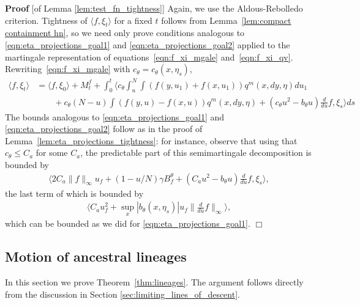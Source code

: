 \documentclass[12pt]{article}
\newenvironment {proof}{{\noindent\bf Proof }}{\hfill $\Box$ \medskip}
\newcommand{\lp}{\xi}              %
\numberwithin{equation}{section}
\begin{document}
\begin{proof}[of Lemma \ref{lem:test_fn_tightness}]
    Again, we use the Aldous-Rebolledo criterion.
    Tightness of $\langle f, \lp_t \rangle$ for a fixed $t$
    follows from Lemma~\ref{lem:compact containment hn},
    so we need only prove conditions analogous to
    \eqref{eqn:eta_projections_goal1}
    and \eqref{eqn:eta_projections_goal2}
    applied to the martingale representation
    of equations~\eqref{eqn:f_xi_mgale} and~\eqref{eqn:f_xi_qv}.
    Rewriting~\eqref{eqn:f_xi_mgale} with $c_\theta = c_\theta(x, \eta_s)$,
    \begin{align*}
        \langle f, \lp_t \rangle
        &=
        \langle f, \lp_0 \rangle
        + M^f_t
        + \int_0^t \Big\langle
            c_\theta \int_u^N \int (f(y, u_1) + f(x, u_1)) q^m(x,dy,\eta) du_1
        \\ {} &\qquad
            + c_\theta (N - u) \int (f(y, u) - f(x, u)) q^m(x,dy,\eta)
            + (c_\theta u^2 - b_\theta u) \frac{d}{du} f,
            \lp_s
        \Big\rangle ds
    \end{align*}
    The bounds analogous to \eqref{eqn:eta_projections_goal1} and \eqref{eqn:eta_projections_goal2}
    follow as in the proof of Lemma~\ref{lem:eta_projections_tightness}:
    for instance, observe that using that $c_\theta \le C_a$ for some $C_a$,
    the predictable part of this semimartingale decomposition is bounded by
    \begin{align*}
        \Big\langle
            2 C_a \|f\|_\infty u_f
            + (1 - u/N) \gamma B^\theta_f
            + (C_a u^2 - b_\theta u) \frac{d}{du} f,
            \lp_s
        \Big\rangle ,
    \end{align*}
    the last term of which is bounded by
    \begin{align*}
        \langle
            C_a u_f^2 + \sup_x |b_\theta(x, \eta_s)| u_f \|\frac{d}{du} f\|_\infty
        \rangle ,
    \end{align*}
    which can be bounded as we did for \eqref{eqn:eta_projections_goal1}.
\end{proof}

\subsection{Motion of ancestral lineages}
\label{sec:lineages_proof}

In this section we prove Theorem~\ref{thm:lineages}.
The argument follows directly from the discussion in Section \ref{sec:limiting_lines_of_descent}.
\end{document}
